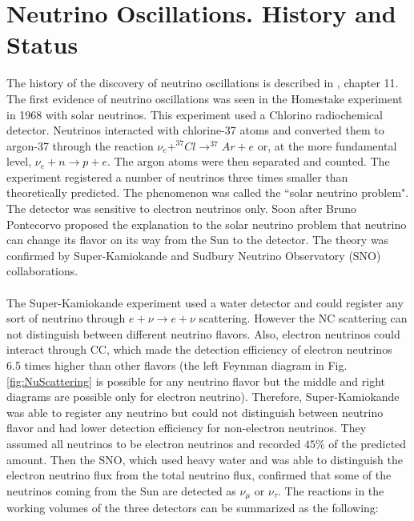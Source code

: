 \section{Neutrino Oscillations. History and Status}

The history of the discovery of neutrino oscillations is described in \cite{ref_Griffiths}, chapter 11. The first evidence of neutrino oscillations was seen in the Homestake experiment in 1968 with solar neutrinos. This experiment used a Chlorino radiochemical detector. Neutrinos interacted with chlorine-37 atoms and converted them to argon-37 through the reaction $\nu_e+^{37}Cl \rightarrow ^{37}Ar+e$ or, at the more fundamental level, $\nu_e+n \rightarrow p+e$. The argon atoms were then separated and counted. The experiment registered a number of neutrinos three times smaller than theoretically predicted. The phenomenon was called the ``solar neutrino problem".  The detector was sensitive to electron neutrinos only. Soon after Bruno Pontecorvo proposed the explanation to the solar neutrino problem that neutrino can change its flavor on its way from the Sun to the detector. The theory was confirmed  by Super-Kamiokande and Sudbury Neutrino Observatory (SNO) collaborations. \\ \\
The Super-Kamiokande experiment used a water detector and could register any sort of neutrino through $e+\nu \rightarrow e+\nu$ scattering. However the NC scattering can not distinguish between different neutrino flavors. Also, electron neutrinos could interact through CC, which made the detection efficiency of electron neutrinos 6.5 times higher than other flavors (the left Feynman diagram in Fig. \ref{fig:NuScattering} is possible for any neutrino flavor but the middle and right diagrams are possible only for electron neutrino). Therefore, Super-Kamiokande was able to register any neutrino but could not distinguish between neutrino flavor and had lower detection efficiency for non-electron neutrinos. They assumed all neutrinos to be electron neutrinos and recorded $45\%$ of the predicted amount. Then the SNO, which used heavy water and was able to distinguish the electron neutrino flux from the total neutrino flux, confirmed that some of the neutrinos coming from the Sun are detected as $\nu_\mu$ or $\nu_\tau$. The reactions in the working volumes of the three detectors can be summarized as the following:\\ 
